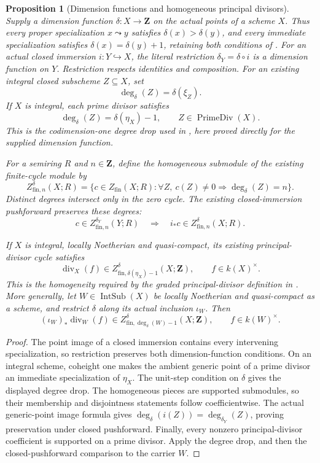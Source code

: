 \documentclass[11pt]{article}
\newtheorem{proposition}[theorem]{Proposition}
\theoremstyle{definition}
\theoremstyle{remark}
\begin{document}
\begin{proposition}[Dimension functions and homogeneous principal divisors]
\label{prop:principal-divisor-degree}
Supply a dimension function \(\delta:X\to\mathbf Z\) on the actual
points of a scheme \(X\). Thus every proper specialization
\(x\leadsto y\) satisfies \(\delta(x)>\delta(y)\), and every immediate
specialization satisfies \(\delta(x)=\delta(y)+1\), retaining both
conditions of \cite{StacksDimensionFunction}.
For an actual closed immersion \(i:Y\hookrightarrow X\), the literal
restriction \(\delta_Y=\delta\circ i\) is a dimension function on \(Y\).
Restriction respects identities and composition.
For an existing integral closed subscheme \(Z\subseteq X\), set
\[
  \deg_\delta(Z)=\delta(\xi_Z).
\]
If \(X\) is integral, each prime divisor satisfies
\[
  \deg_\delta(Z)=\delta(\eta_X)-1,
  \qquad Z\in\operatorname{PrimeDiv}(X).
\]
This is the codimension-one degree drop used in
\cite{StacksPrimeDivisorDimension}, here proved directly for the supplied
dimension function.

For a semiring \(R\) and \(n\in\mathbf Z\), define the homogeneous
submodule of the existing finite-cycle module by
\[
  Z^{\delta}_{\mathrm{fin},n}(X;R)
    =\{c\in Z_{\mathrm{fin}}(X;R):
        \forall Z,\ c(Z)\ne0\Longrightarrow\deg_\delta(Z)=n\}.
\]
Distinct degrees intersect only in the zero cycle. The existing
closed-immersion pushforward preserves these degrees:
\[
  c\in Z^{\delta_Y}_{\mathrm{fin},n}(Y;R)
    \quad\Longrightarrow\quad
  i_*c\in Z^{\delta}_{\mathrm{fin},n}(X;R).
\]

If \(X\) is integral, locally Noetherian and quasi-compact, its existing
principal-divisor cycle satisfies
\[
  \operatorname{div}_X(f)
    \in Z^{\delta}_{\mathrm{fin},\delta(\eta_X)-1}(X;\mathbf Z),
  \qquad f\in k(X)^\times.
\]
This is the homogeneity required by the graded principal-divisor
definition in \cite{StacksGradedPrincipalDivisor}.
More generally, let \(W\in\operatorname{IntSub}(X)\) be locally
Noetherian and quasi-compact as a scheme, and restrict \(\delta\) along
its actual inclusion \(\iota_W\). Then
\[
  (\iota_W)_*\operatorname{div}_W(f)
    \in Z^{\delta}_{\mathrm{fin},\deg_\delta(W)-1}(X;\mathbf Z),
  \qquad f\in k(W)^\times.
\]
\end{proposition}

\begin{proof}
The point image of a closed immersion contains every intervening
specialization, so restriction preserves both dimension-function conditions.
On an integral scheme, coheight one makes the ambient generic point of
a prime divisor an immediate specialization of \(\eta_X\).
The unit-step condition on \(\delta\) gives the displayed degree drop.
The homogeneous pieces are supported submodules, so their membership
and disjointness statements follow coefficientwise. The actual
generic-point image formula gives
\(\deg_\delta(i(Z))=\deg_{\delta_Y}(Z)\), proving preservation under
closed pushforward. Finally, every nonzero principal-divisor coefficient
is supported on a prime divisor. Apply the degree drop, and then the
closed-pushforward comparison to the carrier \(W\).
\end{proof}
\end{document}
